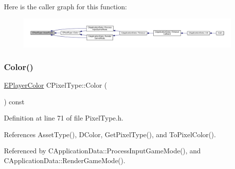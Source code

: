 Here is the caller graph for this function\+:\nopagebreak
\begin{figure}[H]
\begin{center}
\leavevmode
\includegraphics[width=350pt]{classCPixelType_addcf6c6d11e8ebafe4455beaa995b675_icgraph}
\end{center}
\end{figure}
\hypertarget{classCPixelType_a54864220447608dfad4cd579a5a4016c}{}\label{classCPixelType_a54864220447608dfad4cd579a5a4016c} 
\subsubsection{\texorpdfstring{Color()}{Color()}}
{\footnotesize\ttfamily \hyperlink{GameDataTypes_8h_aafb0ca75933357ff28a6d7efbdd7602f}{E\+Player\+Color} C\+Pixel\+Type\+::\+Color (\begin{DoxyParamCaption}{ }\end{DoxyParamCaption}) const\hspace{0.3cm}{\ttfamily [inline]}}



Definition at line 71 of file Pixel\+Type.\+h.



References Asset\+Type(), D\+Color, Get\+Pixel\+Type(), and To\+Pixel\+Color().



Referenced by C\+Application\+Data\+::\+Process\+Input\+Game\+Mode(), and C\+Application\+Data\+::\+Render\+Game\+Mode().


